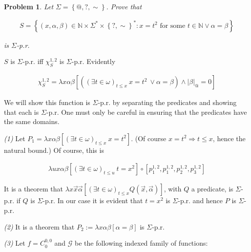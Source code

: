 \documentclass[a4paper, 12pt]{article}
\newtheorem{problem}{Problem}
\newtheorem{problem}{Problem}
\begin{document}
\pagebreak 

\begin{problem}

    Let $\Sigma = \left\{ @, ?, \sim  \right\} $. Prove that 

    \begin{align*}
        S = \left\{ (x, \alpha, \beta) \in \mathbb{N} \times \Sigma^{*} \times
            \left\{ ?, \sim \right\}^{*} : x = t^2 \text{ for some $t \in \mathbb{N}$}
    \lor \alpha = \beta   \right\} 
    \end{align*}

is $\Sigma$-p.r. 

\end{problem}

$S$ is $\Sigma$-p.r. iff $\chi_S^{1, 2}$ is $\Sigma$-p.r. Evidently 

\begin{align*}
    \chi_S^{1, 2} = \lambda x \alpha \beta \left[ \left( (\exists t \in
            \omega)_{t \leq x} ~ x
    = t^2  ~ \lor \alpha = \beta \right) \land |\beta|_{@} = 0 \right]
\end{align*}

We will show this function is $\Sigma$-p.r. by separating the predicates and
showing that each is $\Sigma$-p.r. One must only be careful in ensuring that the
predicates have the same domains.

\textit{(1)} Let $P_1 = \lambda x\alpha\beta \left[ (\exists t \in \omega)_{t
    \leq x} ~ x =
t^2\right]$. (Of course $x = t^2 \Rightarrow t \leq x$, hence the natural
bound.) Of course, this is 

\begin{align*}
    \lambda u x \alpha \beta \left[ (\exists t \in \omega)_{t \leq u} ~ t = x^2
    \right] \circ \left[ p_1^{1, 2}, p_1^{1, 2}, p_2^{1, 2}, p_3^{1, 2} \right] 
\end{align*}

It is a theorem that $\lambda x \vec{x}\vec{\alpha} \left[ (\exists t \in
\omega)_{t \leq x} Q(\vec{x}, \vec{\alpha})   \right]$, with $Q$ a predicate, is
$\Sigma$-p.r. if $Q$ is $\Sigma$-p.r. In our case it is evident that $t = x^2$
is $\Sigma$-p.r. and hence $P$ is $\Sigma$-p.r. 

\textit{(2)} It is a theorem that $P_2 := \lambda x \alpha\beta \left[  \alpha = \beta
\right]$ is $\Sigma$-p.r.  

\textit{(3)} Let $f = C_{0}^{0, 0}$ and $\mathcal{G}$ be the following indexed
family of functions: 
\end{document}
